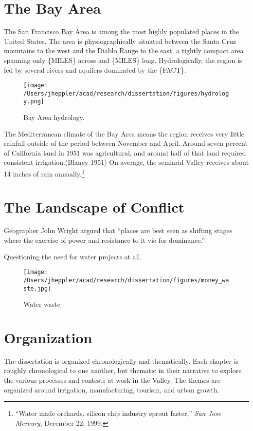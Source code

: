 \documentclass[11pt,article,oneside]{memoir}
\makeatletter
\def\maxwidth{\ifdim\Gin@nat@width>\linewidth\linewidth
\else\Gin@nat@width\fi}
\let\Oldincludegraphics\includegraphics
\renewcommand{\includegraphics}[1]{\Oldincludegraphics[width=\maxwidth]{#1}}
\makeatother
\begin{document}
\section{The Bay Area}

The San Francisco Bay Area is among the most highly populated places in
the United States. The area is physiographically situated between the
Santa Cruz mountains to the west and the Diablo Range to the east, a
tightly compact area spanning only \{MILES\} across and \{MILES\} long.
Hydrologically, the region is fed by several rivers and aquifers
dominated by the \{FACT\}.

\begin{figure}[htbp]
\centering
\texttt{[image: /Users/jheppler/acad/research/dissertation/figures/hydrology.png]}
\caption{Bay Area hydrology.}
\end{figure}

The Mediterranean climate of the Bay Area means the region receives very
little rainfall outside of the period between November and April. Around
seven percent of California land in 1951 was agricultural, and around
half of that land required consistent irrigation.(Blaney 1951) On
average, the semiarid Valley receives about 14 inches of rain
annually.\footnote{``Water made orchards, silicon chip industry sprout
  faster,'' \emph{San Jose Mercury}, December 22, 1999.}

\section{The Landscape of Conflict}

Geographer John Wright argued that ``places are best seen as shifting
stages where the exercise of power and resistance to it vie for
dominance.''

Questioning the need for water projects at all.

\begin{figure}[htbp]
\centering
\texttt{[image: /Users/jheppler/acad/research/dissertation/figures/money\_waste.jpg]}
\caption{Water waste}
\end{figure}

\section{Organization}

The dissertation is organized chronologically and thematically. Each
chapter is roughly chronological to one another, but thematic in their
narrative to explore the various processes and contests at work in the
Valley. The themes are organized around irrigation, manufacturing,
tourism, and urban growth.
\end{document}
